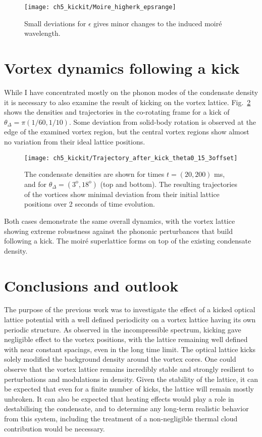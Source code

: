     \begin{figure}
        \centering
        \texttt{[image: ch5\_kickit/Moire\_higherk\_epsrange]}
    	\caption[Moir\'e wavelengths for imperfect lattice alignment.]{Small deviations for $\epsilon$ gives minor changes to the induced moir\'e wavelength.}\label{fig:epsilon}
    \end{figure}


\section{Vortex dynamics following a kick}
While I have concentrated mostly on the phonon modes of the condensate density it is necessary to also examine the result of kicking on the vortex lattice. Fig.~\ref{fig:kickit_traj} shows the densities and trajectories in the co-rotating frame for a kick of $\theta_{\Delta}=\pi (1/60, 1/10)$. Some deviation from solid-body rotation is observed at the edge of the examined vortex region, but the central vortex regions show almost no variation from their ideal lattice positions.
\begin{figure}
    \centering
    \texttt{[image: ch5\_kickit/Trajectory\_after\_kick\_theta0\_15\_3offset]}
	\caption[Vortex densities and trajectories following a kick.]{The condensate densities are shown for times $t=(20,200)$ ms, and for $\theta_\Delta = ( 3^{\textrm{o}},18^{\textrm{o}})$ (top and bottom). The resulting trajectories of the vortices show minimal deviation from their initial lattice positions over 2 seconds of time evolution.}\label{fig:kickit_traj}
\end{figure}

Both cases demonstrate the same overall dynamics, with the vortex lattice showing extreme robustness against the phononic perturbances that build following a kick. The moir\'e superlattice forms on top of the existing condensate density.

\section{Conclusions and outlook}\label{sec:ch5_conc}
The purpose of the previous work was to investigate the effect of a kicked optical lattice potential with a well defined periodicity on a vortex lattice having its own periodic structure. As observed in the incompressible spectrum, kicking gave negligible effect to the vortex positions, with the lattice remaining well defined with near constant spacings, even in the long time limit. The optical lattice kicks solely modified the background density around the vortex cores. One could observe that the vortex lattice remains incredibly stable and strongly resilient to perturbations and modulations in density. Given the stability of the lattice, it can be expected that even for a finite number of kicks, the lattice will remain mostly unbroken. It can also be expected that heating effects would play a role in destabilising the condensate, and to determine any long-term realistic behavior from this system, including the treatment of a non-negligible thermal cloud contribution would be necessary.


